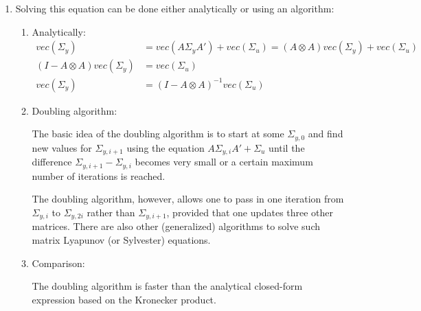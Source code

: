 \begin{enumerate}
\item Solving this equation can be done either analytically or using an algorithm:
\begin{enumerate}
    \item Analytically:
        \begin{align*}
            vec(\Sigma_y) &= vec(A \Sigma_y A') + vec(\Sigma_u) = (A \otimes A)vec(\Sigma_y) + vec(\Sigma_u)\\
            (I-A\otimes A)vec(\Sigma_y) &= vec(\Sigma_u)\\
            vec(\Sigma_y) &= (I-A\otimes A)^{-1}vec(\Sigma_u)
        \end{align*}
    \item Doubling algorithm:
    
    The basic idea of the doubling algorithm is to start at some \(\Sigma_{y,0}\)
    and find new values for \(\Sigma_{y,i+1}\) using the equation \(A \Sigma_{y,i} A' + \Sigma_u\)
    until the difference \(\Sigma_{y,i+1} - \Sigma_{y,i}\) becomes very small
    or a certain maximum number of iterations is reached.
    
    The doubling algorithm, however, allows one to pass in one iteration
    from \(\Sigma_{y,i}\) to \(\Sigma_{y,2i}\) rather than \(\Sigma_{y,i+1}\),
    provided that one updates three other matrices.
    There are also other (generalized) algorithms to solve such matrix Lyapunov (or Sylvester) equations.

    \item Comparison:
    
    The doubling algorithm is faster than the analytical closed-form expression based on the Kronecker product.
\end{enumerate}
		
\end{enumerate}